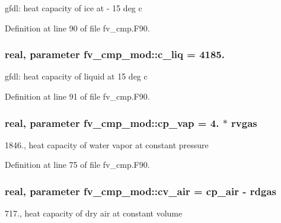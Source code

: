 gfdl\-: heat capacity of ice at -\/ 15 deg c 



Definition at line 90 of file fv\-\_\-cmp.\-F90.

\subsubsection[{c\-\_\-liq}]{\setlength{\rightskip}{0pt plus 5cm}real, parameter fv\-\_\-cmp\-\_\-mod\-::c\-\_\-liq = 4185.\hspace{0.3cm}{\ttfamily [private]}}\label{classfv__cmp__mod_ae3486a6a9602d9d6d55f4935aa0ffb0b}


gfdl\-: heat capacity of liquid at 15 deg c 



Definition at line 91 of file fv\-\_\-cmp.\-F90.

\subsubsection[{cp\-\_\-vap}]{\setlength{\rightskip}{0pt plus 5cm}real, parameter fv\-\_\-cmp\-\_\-mod\-::cp\-\_\-vap = 4. $\ast$ rvgas\hspace{0.3cm}{\ttfamily [private]}}\label{classfv__cmp__mod_a7380eb8077e00279e9bb042e5a69f39b}


1846., heat capacity of water vapor at constant pressure 



Definition at line 75 of file fv\-\_\-cmp.\-F90.

\subsubsection[{cv\-\_\-air}]{\setlength{\rightskip}{0pt plus 5cm}real, parameter fv\-\_\-cmp\-\_\-mod\-::cv\-\_\-air = cp\-\_\-air -\/ rdgas\hspace{0.3cm}{\ttfamily [private]}}\label{classfv__cmp__mod_a6b7e31c99aaa43c3c88e5f148a0ada8c}


717., heat capacity of dry air at constant volume 



